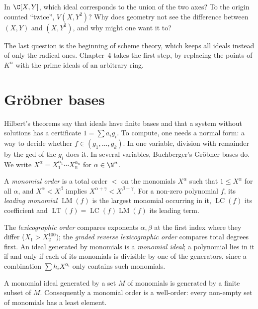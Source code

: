 \begin{think}
In $\C[X,Y]$, which ideal corresponds to the union of the two axes? To the origin counted ``twice'', $V(X,Y^2)$? Why does geometry not see the difference between $(X,Y)$ and $(X,Y^2)$, and why might one want it to?
\end{think}

The last question is the beginning of scheme theory, which keeps all ideals instead of only the radical ones. Chapter~4 takes the first step, by replacing the points of $K^n$ with the prime ideals of an arbitrary ring.

\section{Gröbner bases}

Hilbert's theorems say that ideals have finite bases and that a system without solutions has a certificate $1=\sum a_ig_i$. To compute, one needs a normal form: a way to decide whether $f\in(g_1,\dots,g_k)$. In one variable,
division with remainder by the gcd of the $g_i$ does it. In several variables, Buchberger's Gröbner bases do. We write $X^\alpha=X_1^{\alpha_1}\cdots X_n^{\alpha_n}$ for $\alpha\in\N^n$.

\begin{definition}\label{def:monomialorder}
A \emph{monomial order} is a total order $<$ on the monomials $X^\alpha$ such that $1\le X^\alpha$ for all $\alpha$, and $X^\alpha<X^\beta$ implies $X^{\alpha+\gamma}<X^{\beta+\gamma}$. For a non-zero polynomial $f$, its \emph{leading monomial}
$\operatorname{LM}(f)$ is the largest monomial occurring in it, $\operatorname{LC}(f)$ its coefficient and $\operatorname{LT}(f)=\operatorname{LC}(f)\operatorname{LM}(f)$ its leading term.
\end{definition}

The \emph{lexicographic order} compares exponents $\alpha,\beta$ at the first index where they differ ($X_1>X_2^{100}$); the \emph{graded reverse lexicographic order} compares total degrees first. An ideal generated by
monomials is a \emph{monomial ideal}; a polynomial lies in it if and only if each of its monomials is divisible by one of the generators, since a combination $\sum h_iX^{\alpha_i}$ only contains such monomials.

\begin{lemma}[Dickson]\label{lem:dickson}
A monomial ideal generated by a set $M$ of monomials is generated by a finite subset of $M$. Consequently a monomial order is a well-order: every non-empty set of monomials has a least element.
\end{lemma}

